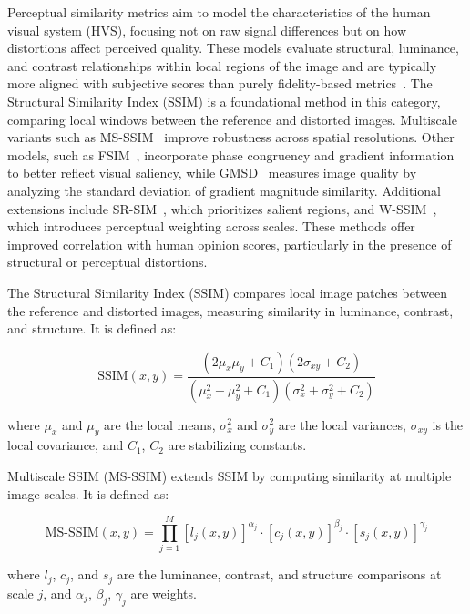 Perceptual similarity metrics aim to model the characteristics of the human visual system (HVS), focusing not on raw signal differences but on how distortions affect perceived quality. These models evaluate structural, luminance, and contrast relationships within local regions of the image and are typically more aligned with subjective scores than purely fidelity-based metrics~\cite{wang2004image,chandler2007vsnr}. The Structural Similarity Index (SSIM) is a foundational method in this category, comparing local windows between the reference and distorted images. Multiscale variants such as MS-SSIM~\cite{Wang2003MSSSIM} improve robustness across spatial resolutions. Other models, such as FSIM~\cite{Zhang2011FSIM}, incorporate phase congruency and gradient information to better reflect visual saliency, while GMSD~\cite{Xue2014GMSD} measures image quality by analyzing the standard deviation of gradient magnitude similarity. Additional extensions include SR-SIM~\cite{Zhang2012SRSIM}, which prioritizes salient regions, and W-SSIM~\cite{Engelke2011WSSIM}, which introduces perceptual weighting across scales. These methods offer improved correlation with human opinion scores, particularly in the presence of structural or perceptual distortions.

The Structural Similarity Index (SSIM) compares local image patches between the reference and distorted images, measuring similarity in luminance, contrast, and structure. It is defined as:

\begin{equation}
\text{SSIM}(x, y) = \frac{(2\mu_x \mu_y + C_1)(2\sigma_{xy} + C_2)}{(\mu_x^2 + \mu_y^2 + C_1)(\sigma_x^2 + \sigma_y^2 + C_2)}
\end{equation}

where $\mu_x$ and $\mu_y$ are the local means, $\sigma_x^2$ and $\sigma_y^2$ are the local variances, $\sigma_{xy}$ is the local covariance, and $C_1$, $C_2$ are stabilizing constants.

Multiscale SSIM (MS-SSIM) extends SSIM by computing similarity at multiple image scales. It is defined as:

\begin{equation}
\text{MS-SSIM}(x, y) = \prod_{j=1}^{M} {[l_j(x, y)]}^{\alpha_j} \cdot {[c_j(x, y)]}^{\beta_j} \cdot {[s_j(x, y)]}^{\gamma_j}
\end{equation}

where $l_j$, $c_j$, and $s_j$ are the luminance, contrast, and structure comparisons at scale $j$, and $\alpha_j$, $\beta_j$, $\gamma_j$ are weights.

